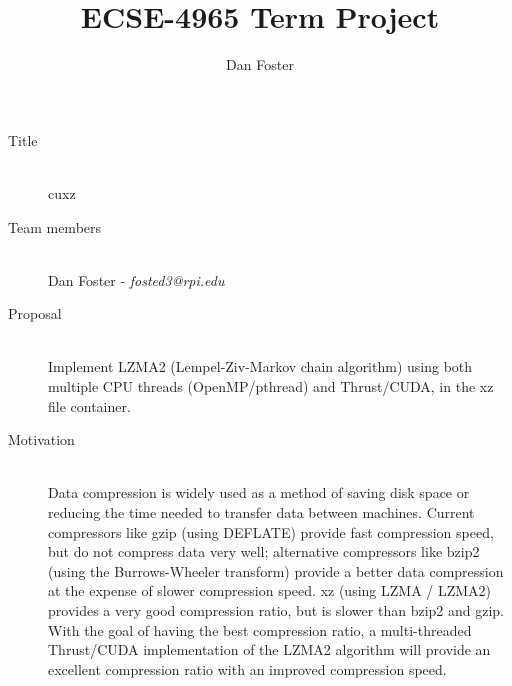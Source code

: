 \documentclass[10pt]{article}
\begin{document}
\title{ECSE-4965 Term Project}
\author{Dan Foster}
\maketitle
\begin{description}
\item[Title] \hfill \\ %
cuxz
\item[Team members] \hfill \\ %
Dan Foster - \textit{fosted3@rpi.edu}
\item[Proposal] \hfill \\ %
Implement LZMA2 (Lempel-Ziv-Markov chain algorithm) using both multiple CPU threads (OpenMP/pthread) and Thrust/CUDA, in the xz file container.
\item[Motivation] \hfill \\ %
Data compression is widely used as a method of saving disk space or reducing the time needed to transfer data between machines. Current compressors like gzip (using DEFLATE) provide fast compression speed, but do not compress data very well; alternative compressors like bzip2 (using the Burrows-Wheeler transform) provide a better data compression at the expense of slower compression speed. xz (using LZMA / LZMA2) provides a very good compression ratio, but is slower than bzip2 and gzip. With the goal of having the best compression ratio, a multi-threaded Thrust/CUDA implementation of the LZMA2 algorithm will provide an excellent compression ratio with an improved compression speed.
\end{description}
\end{document}
